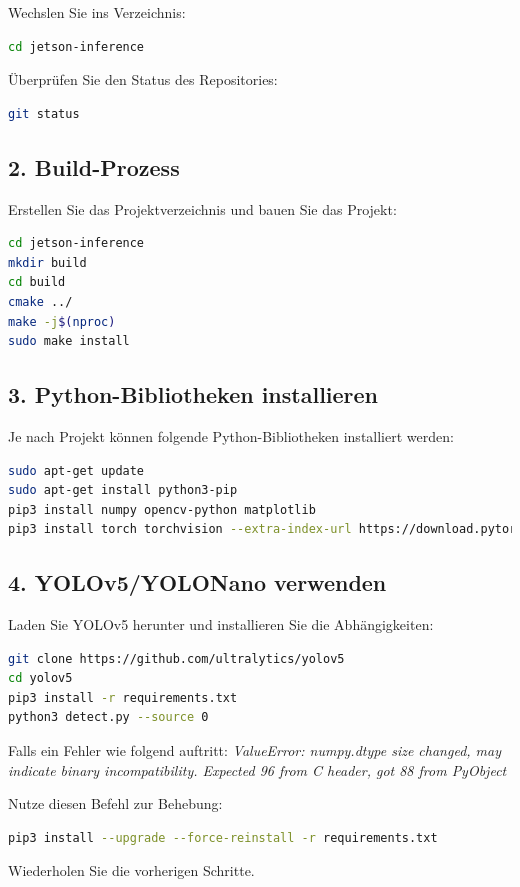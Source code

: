 \documentclass{article}
\begin{document}
Wechslen Sie ins Verzeichnis:
\begin{lstlisting}[language=bash]
cd jetson-inference
\end{lstlisting}

Überprüfen Sie den Status des Repositories:
\begin{lstlisting}[language=bash]
git status
\end{lstlisting}

\subsection*{2. Build-Prozess}
Erstellen Sie das Projektverzeichnis und bauen Sie das Projekt:
\begin{lstlisting}[language=bash]
cd jetson-inference
mkdir build
cd build
cmake ../
make -j$(nproc)
sudo make install
\end{lstlisting}

\subsection*{3. Python-Bibliotheken installieren}
Je nach Projekt können folgende Python-Bibliotheken installiert werden:

\begin{lstlisting}[language=bash]
sudo apt-get update
sudo apt-get install python3-pip
pip3 install numpy opencv-python matplotlib
pip3 install torch torchvision --extra-index-url https://download.pytorch.org/whl/cu118
\end{lstlisting}

\subsection*{4. YOLOv5/YOLONano verwenden}
Laden Sie YOLOv5 herunter und installieren Sie die Abhängigkeiten:
\begin{lstlisting}[language=bash]
git clone https://github.com/ultralytics/yolov5 
cd yolov5
pip3 install -r requirements.txt
python3 detect.py --source 0 
\end{lstlisting}

Falls ein Fehler wie folgend auftritt: 
\textit{ValueError: numpy.dtype size changed, may indicate binary incompatibility. 
Expected 96 from C header, got 88 from PyObject}

Nutze diesen Befehl zur Behebung:
\begin{lstlisting}[language=bash]
pip3 install --upgrade --force-reinstall -r requirements.txt
\end{lstlisting}
Wiederholen Sie die vorherigen Schritte.
\end{document}
